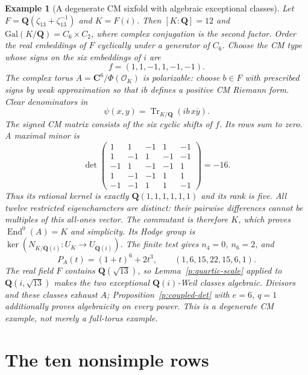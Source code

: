 \documentclass[11pt,reqno]{article}
\theoremstyle{emphasizedplain}
\theoremstyle{emphasizeddefinition}
\newtheorem{example}[theorem]{Example}
\theoremstyle{emphasizeddefinition}
\DeclareMathOperator{\End}{End}
\DeclareMathOperator{\Tr}{Tr}
\newcommand{\Q}{\mathbf Q}
\newcommand{\C}{\mathbf C}
\begin{document}
\begin{example}[A degenerate CM sixfold with algebraic exceptional classes]
Let $F=\Q(\zeta_{13}+\zeta_{13}^{-1})$ and $K=F(i)$.
Then $[K:\Q]=12$ and $\mathrm{Gal}(K/\Q)=C_6\times C_2$,
where complex conjugation is the second factor. Order the real
embeddings of $F$ cyclically under a generator of $C_6$. Choose the
CM type whose signs on the six embeddings of $i$ are
\[
 f=(1,1,-1,1,-1,-1).
\]
The complex torus $A=\C^6/\Phi(\mathcal O_K)$ is polarizable:
choose $b\in F$ with prescribed signs by weak approximation so that
$ib$ defines a positive CM Riemann form. Clear denominators in
\[\psi(x,y)=\Tr_{K/\Q}(ib\,x\overline y).\]
The signed CM matrix consists of the six cyclic shifts of $f$.
Its rows sum to zero. A maximal minor is
\[
 \det\begin{pmatrix}
 1&1&-1&1&-1\\
 1&-1&1&-1&-1\\
 -1&1&-1&-1&1\\
 1&-1&-1&1&1\\
 -1&-1&1&1&-1
 \end{pmatrix}=-16.
\]
Thus its rational kernel is exactly $\Q(1,1,1,1,1,1)$ and its rank
is five. All twelve restricted eigencharacters are distinct: their
pairwise differences cannot be multiples of this all-ones vector.
The commutant is therefore $K$, which proves $\End^0(A)=K$ and simplicity.
Its Hodge group is $\ker(N_{K/\Q(i)}:U_K\to U_{\Q(i)})$.
The finite test gives $n_4=0$, $n_6=2$, and
\[
 P_A(t)=(1+t)^6+2t^3,
 \qquad (1,6,15,22,15,6,1).
\]
The real field $F$ contains $\Q(\sqrt{13})$, so
Lemma~\ref{p:quartic-scale} applied to $\Q(i,\sqrt{13})$ makes the
two exceptional $\Q(i)$-Weil classes algebraic.
Divisors and these classes exhaust $A$; Proposition~\ref{p:coupled-det}
with $e=6$, $q=1$ additionally proves algebraicity on every power.
This is a degenerate CM example, not merely a full-torus example.
\end{example}

\part{The ten nonsimple rows}
\end{document}
